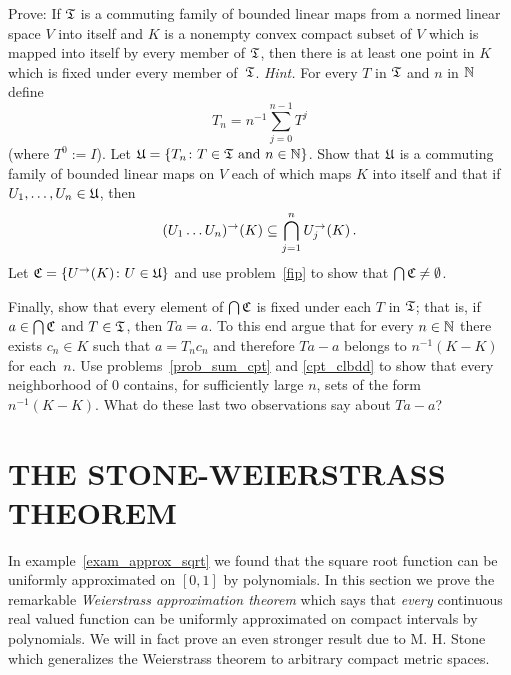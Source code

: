\begin{prob}
Prove: If $\mathfrak{T}$ is a commuting family of bounded linear maps from a normed linear
space $V$ into itself and $K$ is a nonempty convex compact subset of $V$ which is mapped
into itself by every member of $\mathfrak{T}$, then there is at least one point in $K$ which
is fixed under every member of~$\mathfrak{T}$. \emph{Hint.}  For every $T$ in $\mathfrak{T}$ and
$n$ in $\mathbb{N}$ define
  \[ T_n = n^{-1}\sum_{j=0}^{n-1} T^j \]
(where $T^0 := I$).  Let $\mathfrak{U}= \{T_n\colon T \in \mathfrak{T} \text{ and } n \in \mathbb{N}\}$.
Show that $\mathfrak{U}$ is a commuting family of bounded linear maps on $V$ each of which
maps $K$ into itself and that if $U_1,\dots, U_n \in \mathfrak{U}$, then
  \[ (U_1 \dots U_n)^\rightarrow (K) \subseteq \bigcap_{j=1}^n U_j^\rightarrow (K)\,. \]
Let $\mathfrak{C} = \{U^\rightarrow (K)\colon U \in \mathfrak{U}\}$ and use problem~\ref{fip} to show that
$\bigcap\mathfrak{C} \ne \emptyset$.

Finally, show that every element of $\bigcap\mathfrak{C}$ is fixed under each $T$ in $\mathfrak{T}$; that is, if $a \in \bigcap\mathfrak{C}$ and $T \in \mathfrak{T}$, then $Ta = a$.  To this end
argue that for every $n \in \mathbb{N}$ there exists $c_n \in K$ such that $a = T_nc_n$ and
therefore $Ta - a$ belongs to $n^{-1}(K-K)$ for each~$n$.  Use
problems~\ref{prob_sum_cpt} and \ref{cpt_clbdd} to show that every neighborhood of $0$
contains, for sufficiently large $n$, sets of the form $n^{-1}(K-K)$.  What do these last
two observations say about $Ta - a$?
\end{prob}

















\section{THE STONE-WEIERSTRASS THEOREM}
In example~\ref{exam_approx_sqrt} we found that the square root function can be uniformly
approximated on $[0,1]$ by polynomials. In this section we prove the remarkable
\emph{Weierstrass approximation theorem} which says that \emph{every} continuous real valued
function can be uniformly approximated on compact intervals by polynomials.  We will in fact
prove an even stronger result due to M. H. Stone which generalizes the Weierstrass theorem to
arbitrary compact metric spaces.

